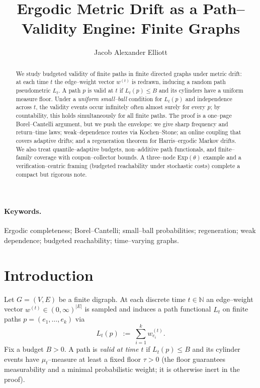 \documentclass[11pt]{article}
\title{\bf Ergodic Metric Drift as a Path–Validity Engine: Finite Graphs}
\author{Jacob Alexander Elliott}
\date{}
\theoremstyle{plain}
\theoremstyle{definition}
\newcommand{\N}{\mathbb{N}}
\begin{document}
\maketitle

\begin{abstract}
We study budgeted validity of finite paths in finite directed graphs under metric drift: at each time $t$ the edge–weight vector $w^{(t)}$ is redrawn, inducing a random path pseudometric $L_t$. A path $p$ is valid at $t$ if $L_t(p)\le B$ and its cylinders have a uniform measure floor. Under a \emph{uniform small–ball} condition for $L_t(p)$ and independence across $t$, the validity events occur infinitely often almost surely for every $p$; by countability, this holds simultaneously for all finite paths. The proof is a one–page Borel–Cantelli argument, but we push the envelope: we give sharp frequency and return–time laws; weak–dependence routes via Kochen–Stone; an online coupling that covers adaptive drifts; and a regeneration theorem for Harris–ergodic Markov drifts. We also treat quantile–adaptive budgets, non–additive path functionals, and finite–family coverage with coupon–collector bounds. A three–node $\mathrm{Exp}(\theta)$ example and a verification–centric framing (budgeted reachability under stochastic costs) complete a compact but rigorous note.
\end{abstract}

\paragraph{Keywords.}
Ergodic completeness; Borel–Cantelli; small–ball probabilities; regeneration; weak dependence; budgeted reachability; time–varying graphs.

\section{Introduction}
Let $G=(V,E)$ be a finite digraph. At each discrete time $t\in\N$ an edge–weight vector $w^{(t)}\in(0,\infty)^{|E|}$ is sampled and induces a path functional $L_t$ on finite paths $p=(e_1,\dots,e_k)$ via
\[
L_t(p)\;:=\;\sum_{i=1}^k w^{(t)}_{e_i}.
\]
Fix a budget $B>0$. A path is \emph{valid at time $t$} if $L_t(p)\le B$ and its cylinder events have $\mu_t$–measure at least a fixed floor $\tau>0$ (the floor guarantees measurability and a minimal probabilistic weight; it is otherwise inert in the proof).
\end{document}
